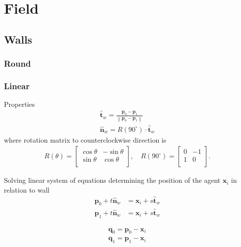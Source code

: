 \section{Field}
\subsection{Walls}
\subsubsection{Round}

\subsubsection{Linear}
Properties
\begin{align}
\hat{\mathbf{t}}_{w} = \frac{\mathbf{p}_{0} - \mathbf{p}_{1}}{\left\|\mathbf{p}_{0} - \mathbf{p}_{1}\right\|} \\
\hat{\mathbf{n}}_{w} = R(90^{\circ}) \cdot \hat{\mathbf{t}}_{w}
\end{align}
where rotation matrix to counterclockwise direction is
\begin{align}
R(\theta) = \begin{bmatrix}\cos \theta & -\sin \theta \\\sin \theta & \cos \theta \\\end{bmatrix}, \quad R(90^{\circ}) = \begin{bmatrix}0 & -1 \\ 1 & 0 \\\end{bmatrix}.
\end{align}

Solving linear system of equations determining the position of the agent $ \mathbf{x}_{i} $ in relation to wall
\begin{align}
\mathbf{p}_{0} + t \hat{\mathbf{n}}_{w} &= \mathbf{x}_{i} + s \hat{\mathbf{t}}_{w} \\
\mathbf{p}_{1} + t \hat{\mathbf{n}}_{w} &= \mathbf{x}_{i} + s \hat{\mathbf{t}}_{w}
\end{align}

\begin{align}
\mathbf{q}_{0} = \mathbf{p}_{0} - \mathbf{x}_{i} \\
\mathbf{q}_{1} =\mathbf{p}_{1} - \mathbf{x}_{i}
\end{align}

